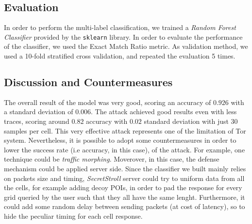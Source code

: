 \documentclass[10pt,conference,compsocconf]{IEEEtran}
\begin{document}
\subsection{Evaluation}
In order to perform the multi-label classification, we trained a \textit{Random Forest Classifier} provided by the \texttt{sklearn} library. In order to evaluate the performance of the classifier, we used the Exact Match Ratio metric. As validation method, we used a 10-fold stratified cross validation, and repeated the evaluation 5 times.

\subsection{Discussion and Countermeasures}
The overall result of the model was very good, scoring an accuracy of $0.926$ with a standard deviation of $0.006$.
The attack achieved good results even with less traces, scoring around $0.82$ accuracy with $0.02$ standard deviation with just 30 samples per cell.
This very effective attack represents one of the limitation of Tor system. Nevertheless, it is possible to adopt some countermeasures in order to lower the success rate (i.e accuracy, in this case), of the attack. For example, one technique could be \textit{traffic morphing}. Moverover, in this case, the defense mechanism could be applied server side. Since the classifier we built mainly relies on packets size and timing, \textit{SecretStroll} server could try to uniform data from all the cells, for example adding decoy POIs, in order to pad the response for every grid queried by the user such that they all have the same lenght. Furthermore, it could add some random delay between sending packets (at cost of latency), so to hide the peculiar timing for each cell response.



\printbibliography
\end{document}
